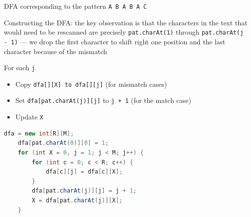 \documentclass[8pt,a4paper,compress]{beamer}
\begin{document}
\begin{frame}[fragile]
\pause

DFA corresponding to the pattern \lstinline{A B A B A C}
\begin{center}
\end{center}
\end{frame}

\begin{frame}[fragile]
\pause

Constructing the DFA: the key observation is that the characters in the text that would need to be rescanned are precisely \lstinline{pat.charAt(1)} through \lstinline{pat.charAt(j - 1)} --- we drop the first character to shift right one position and the last character because of the mismatch

\pause
\bigskip

For each \lstinline{j}
\begin{itemize}
\item Copy \lstinline{dfa[][X] to dfa[][j]} (for mismatch cases)
\item Set \lstinline{dfa[pat.charAt(j)][j]} to \lstinline{j + 1} (for the match case)
\item Update \lstinline{X}
\end{itemize}

\begin{lstlisting}[language=Java]
    dfa = new int[R][M];     
    dfa[pat.charAt(0)][0] = 1; 
    for (int X = 0, j = 1; j < M; j++) {
        for (int c = 0; c < R; c++) { 
            dfa[c][j] = dfa[c][X]; 
        }
        dfa[pat.charAt(j)][j] = j + 1;  
        X = dfa[pat.charAt(j)][X];  
    } 
\end{lstlisting}
\end{frame}
\end{document}
